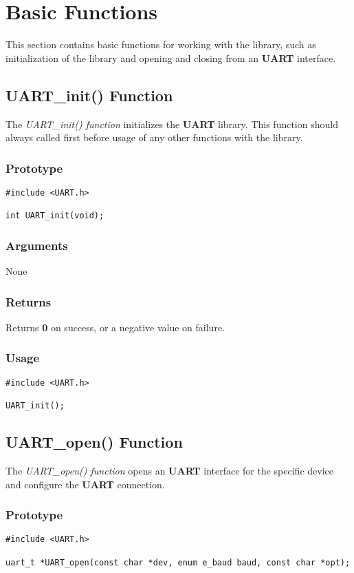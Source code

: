 \documentclass{report}
\begin{document}
\section{Basic Functions}
This section contains basic functions for working with the library, such
as initialization of the library and opening and closing from an \textbf{UART}
interface.
\subsection{UART\_init() Function}
The \textit{UART\_init() function} initializes the \textbf{UART} library.
This function should always called first before usage of any other
functions with the library.
\subsubsection*{Prototype}
\begin{lstlisting}
#include <UART.h>

int UART_init(void);
\end{lstlisting}
\subsubsection*{Arguments}
None
\subsubsection*{Returns}
Returns \textbf{0} on success, or a negative value on failure.
\subsubsection*{Usage}
\begin{lstlisting}
#include <UART.h>

UART_init();
\end{lstlisting}
\subsection{UART\_open() Function}
The \textit{UART\_open() function} opens an \textbf{UART} interface for
the specific device and configure the \textbf{UART} connection.
\subsubsection*{Prototype}
\begin{lstlisting}
#include <UART.h>

uart_t *UART_open(const char *dev, enum e_baud baud, const char *opt);
\end{lstlisting}
\end{document}
